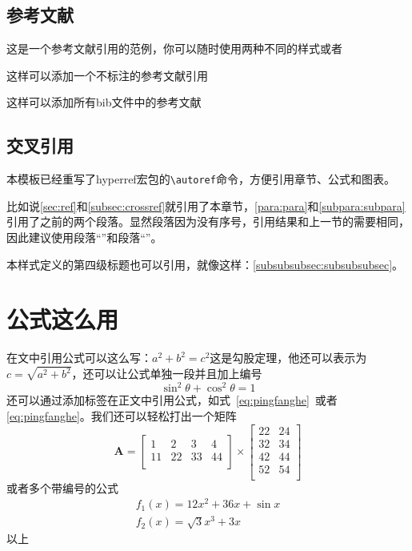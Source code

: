 \documentclass[supercite]{HustGraduTrans}
\begin{document}
    \subsection{参考文献}
    这是一个参考文献引用的范例\cite{Stone_1998}，你可以随时使用两种不同的样式或者\supercite{Stone_1998}
    
    这样可以添加一个不标注的参考文献引用\nocite{9787508342894}
    
    这样可以添加所有bib文件中的参考文献\nocite{*}
    
    \subsection{交叉引用}\label{subsec:crossref}
    本模板已经重写了hyperref宏包的\verb|\autoref|命令，方便引用章节、公式和图表。
    
    比如说\autoref{sec:ref}和\autoref{subsec:crossref}就引用了本章节，\autoref{para:para}和\autoref{subpara:subpara}引用了之前的两个段落。显然段落因为没有序号，引用结果和上一节的需要相同，因此建议使用段落“”和段落“”。
    
    本样式定义的第四级标题也可以引用，就像这样：\autoref{subsubsubsec:subsubsubsec}。
    
    
    
    \section{公式这么用}
    在文中引用公式可以这么写：$a^2+b^2=c^2$这是勾股定理，他还可以表示为$c=\sqrt{a^2+b^2}$，还可以让公式单独一段并且加上编号
    \begin{equation}
    \sin^2{\theta}+\cos^2{\theta}=1 \label{eq:pingfanghe}
    \end{equation}
    还可以通过添加标签在正文中引用公式，如式~\eqref{eq:pingfanghe}~或者\autoref{eq:pingfanghe}。我们还可以轻松打出一个矩阵
    \begin{equation}
    \bm{A}=\begin{bmatrix}
    1&2&3&4\\
    11&22&33&44\\
    \end{bmatrix}
    \times\begin{bmatrix}
    22&24\\
    32&34\\
    42&44\\
    52&54\\
    \end{bmatrix}
    \end{equation}
    或者多个带编号的公式
    \begin{eqnarray}
    f_1(x)=12x^2+36x+\sin x\\
    f_2(x)=\sqrt{3}{x^3+3x}
    \end{eqnarray}
    以上
    
\end{document}

